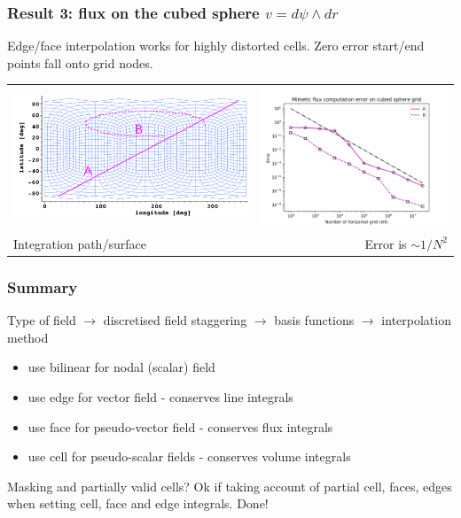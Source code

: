 \documentclass[aspectratio=169]{beamer}
\begin{document}
\begin{frame}[t]
  \frametitle{Result 3: flux on the cubed sphere $v = d\psi \wedge dr$}
  \begin{block}{Edge/face interpolation works for highly distorted cells. Zero error start/end points fall onto grid nodes.}
  \end{block}
  
  \begin{tabular}{lr}
  \includegraphics[width=75mm]{fluxOnCubedSphere.png} & 
  \includegraphics[width=60mm]{cubedSphereFluxError.png} \\
  {Integration path/surface} & {Error is $\sim 1/N^2$} 
  \end{tabular}
\end{frame}

\begin{frame}[t]
  \frametitle{Summary}
    \begin{block}{Type of field $\rightarrow$ discretised field staggering $\rightarrow$ basis functions $\rightarrow$ interpolation method}
      \begin{itemize}%
	  \item use bilinear for nodal (scalar) field
	  \item use {\color{red} edge} for vector field - conserves line integrals
	  \item use {\color{red} face} for pseudo-vector field - conserves flux integrals
	  \item use cell for pseudo-scalar fields - conserves volume integrals
    \end{itemize}
    \end{block}
    \begin{block}{Masking and partially valid cells?}
	 Ok if taking account of partial cell, faces, edges when setting cell, face and edge integrals. Done!
  \end{block}
\end{frame}
\end{document}
